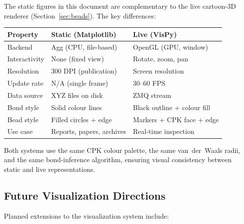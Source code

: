\documentclass[11pt,a4paper]{article}
\begin{document}
The static figures in this document are complementary to the live
cartoon-3D renderer (Section~\ref{sec:beads}).  The key differences:

\begin{center}
\begin{tabular}{lll}
\toprule
\textbf{Property} & \textbf{Static (Matplotlib)} & \textbf{Live (VisPy)} \\
\midrule
Backend     & Agg (CPU, file-based)       & OpenGL (GPU, window) \\
Interactivity & None (fixed view)         & Rotate, zoom, pan \\
Resolution  & 300 DPI (publication)       & Screen resolution \\
Update rate & N/A (single frame)          & 30--60 FPS \\
Data source & XYZ files on disk           & ZMQ stream \\
Bond style  & Solid colour lines          & Black outline + colour fill \\
Bead style  & Filled circles + edge       & Markers + CPK face + edge \\
Use case    & Reports, papers, archives   & Real-time inspection \\
\bottomrule
\end{tabular}
\end{center}

\noindent Both systems use the same CPK colour palette, the same
van~der~Waals radii, and the same bond-inference algorithm, ensuring
visual consistency between static and live representations.

\subsection{Future Visualization Directions}

Planned extensions to the visualization system include:
\end{document}
